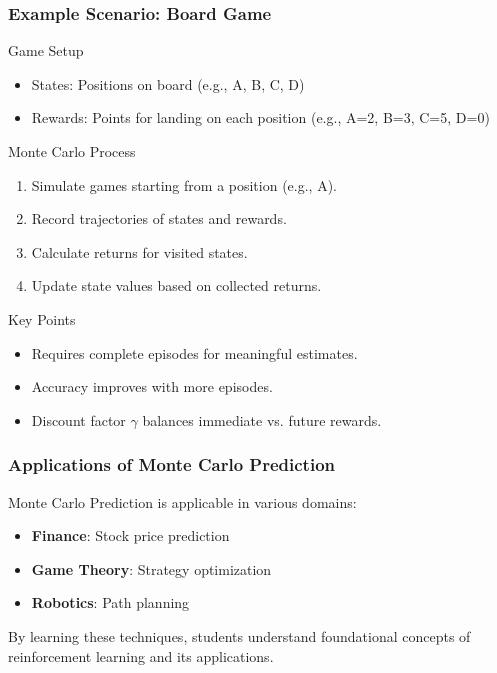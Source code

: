 \documentclass[aspectratio=169]{beamer}
\begin{document}
\begin{frame}[fragile]
    \frametitle{Example Scenario: Board Game}
    \begin{block}{Game Setup}
        \begin{itemize}
            \item States: Positions on board (e.g., A, B, C, D)
            \item Rewards: Points for landing on each position (e.g., A=2, B=3, C=5, D=0)
        \end{itemize}
    \end{block}
    
    \begin{block}{Monte Carlo Process}
        \begin{enumerate}
            \item Simulate games starting from a position (e.g., A).
            \item Record trajectories of states and rewards.
            \item Calculate returns for visited states.
            \item Update state values based on collected returns.
        \end{enumerate}
    \end{block}

    \begin{block}{Key Points}
        \begin{itemize}
            \item Requires complete episodes for meaningful estimates.
            \item Accuracy improves with more episodes.
            \item Discount factor $\gamma$ balances immediate vs. future rewards.
        \end{itemize}
    \end{block}
\end{frame}

\begin{frame}[fragile]
    \frametitle{Applications of Monte Carlo Prediction}
    Monte Carlo Prediction is applicable in various domains:
    \begin{itemize}
        \item \textbf{Finance}: Stock price prediction
        \item \textbf{Game Theory}: Strategy optimization
        \item \textbf{Robotics}: Path planning
    \end{itemize}
    
    By learning these techniques, students understand foundational concepts of reinforcement learning and its applications.
\end{frame}
\end{document}
